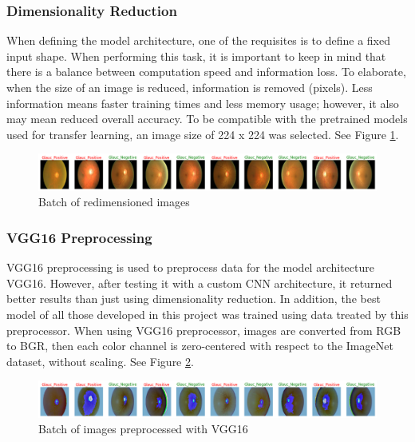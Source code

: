 \documentclass[11pt, a4paper]{article}
\begin{document}
\subsubsection{Dimensionality Reduction}
When defining the model architecture, one of the requisites is to define a fixed input shape. When performing this task, it is important to keep in mind that there is a balance between computation speed and information loss. To elaborate, when the size of an image is reduced, information is removed (pixels). Less information means faster training times and less memory usage; however, it also may mean reduced overall accuracy. To be compatible with the pretrained models used for transfer learning, an image size of 224 x 224 was selected. See Figure \ref{fig:Batch of images with no preprocessing}. 
\begin{figure}[H]
	\centering
	\includegraphics[width=15cm]{imgs/general/Batch of images with no preprocessing.png}
	\caption{Batch of redimensioned images}
	 \label{fig:Batch of images with no preprocessing}
\end{figure}
\subsubsection{VGG16 Preprocessing}
VGG16 preprocessing is used to preprocess data for the model architecture VGG16. However, after testing it with a custom CNN architecture, it returned better results than just using dimensionality reduction. In addition, the best model of all those developed in this project was trained using data treated by this preprocessor. When using VGG16 preprocessor, images are converted from RGB to BGR, then each color channel is zero-centered with respect to the ImageNet dataset, without scaling. See Figure \ref{fig:Batch of images preprocessed with VGG16}. 
\begin{figure}[H]
	\centering
	\includegraphics[width=15cm]{imgs/general/Batch of images preprocessed with VGG16.png}
	\caption{Batch of images preprocessed with VGG16}
	 \label{fig:Batch of images preprocessed with VGG16}
\end{figure}
\end{document}
